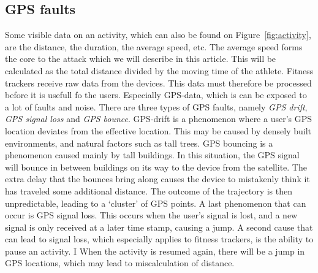 \documentclass[conference]{IEEEtran}
\begin{document}
\subsection{GPS faults}
Some visible data on an activity, which can also be found on
Figure~\ref{fig:activity}, are the distance, the duration, the average speed,
etc. The average speed forms the core to the attack which we will describe in
this article. This will be calculated as the total distance divided by the
moving time of the athlete. Fitness trackers receive raw data from the devices.
This data must therefore be processed before it is usefull fo the users.
Especially GPS-data, which is can be exposed to a lot of faults and noise.
There are three types of GPS faults, namely \textit{GPS drift}, \textit{GPS
    signal loss} and \textit{GPS bounce}. GPS-drift is a phenomenon where a user's
GPS location deviates from the effective location. This may be caused by
densely built environments, and natural factors such as tall trees. GPS
bouncing is a phenomenon caused mainly by tall buildings. In this situation,
the GPS signal will bounce in between buildings on its way to the device from
the satellite. The extra delay that the bounces bring along causes the device
to mistakenly think it has traveled some additional distance. The outcome of
the trajectory is then unpredictable, leading to a `cluster' of GPS points. A
last phenomenon that can occur is GPS signal loss. This occurs when the user's
signal is lost, and a new signal is only received at a later time stamp,
causing a jump. A second cause that can lead to signal loss, which especially
applies to fitness trackers, is the ability to pause an activity. I When the
activity is resumed again, there will be a jump in GPS locations, which may
lead to miscalculation of distance.
\end{document}
